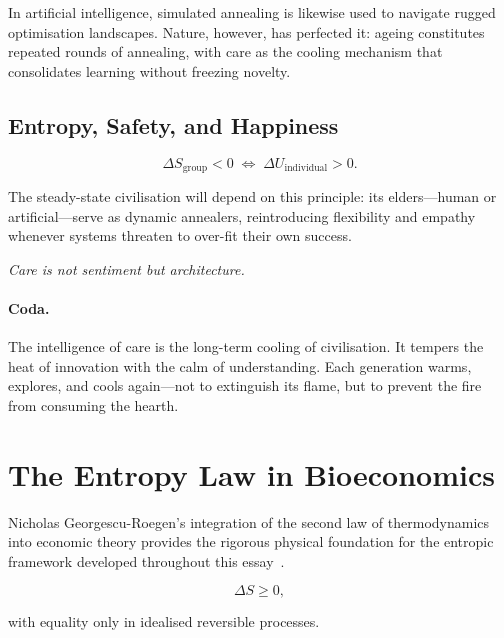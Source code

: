 \documentclass[12pt,a4paper]{article}
\theoremstyle{definition}
\begin{document}
In artificial intelligence, simulated annealing is likewise used to navigate
rugged optimisation landscapes.  Nature, however, has perfected it: ageing
constitutes repeated rounds of annealing, with care as the cooling mechanism
that consolidates learning without freezing novelty.

\subsection{Entropy, Safety, and Happiness}

\begin{equation}
  \Delta S_{\mathrm{group}} < 0
  \;\Longleftrightarrow\;
  \Delta U_{\mathrm{individual}} > 0.
\end{equation}

The steady-state civilisation will depend on this principle: its elders---human
or artificial---serve as dynamic annealers, reintroducing flexibility and
empathy whenever systems threaten to over-fit their own success.

\medskip
\begin{center}
  \itshape Care is not sentiment but architecture.
\end{center}

\paragraph{Coda.}
The intelligence of care is the long-term cooling of civilisation.  It tempers
the heat of innovation with the calm of understanding.  Each generation warms,
explores, and cools again---not to extinguish its flame, but to prevent the
fire from consuming the hearth.

\section{The Entropy Law in Bioeconomics}
\label{sec:georgescu}

Nicholas Georgescu-Roegen's integration of the second law of thermodynamics
into economic theory provides the rigorous physical foundation for the entropic
framework developed throughout this essay~\citep{georgesuroegen1971}.

\begin{equation}
  \Delta S \geq 0,
\end{equation}

with equality only in idealised reversible processes.
\end{document}

